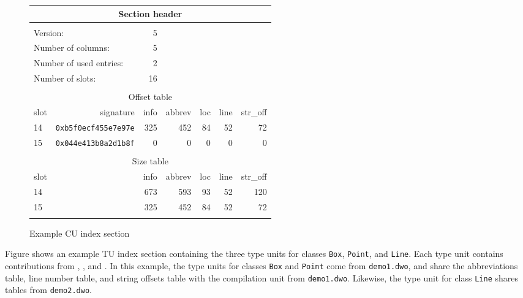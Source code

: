 \begin{figure}[ht]
\begin{center}
\begin{tabular}{lrrrrrr}
\\
  \multicolumn{7}{c}{Section header} \\
\hline \\
  \multicolumn{2}{l}{Version:}&                 5 &&&&\\
  \multicolumn{2}{l}{Number of columns:}&       5 &&&&\\
  \multicolumn{2}{l}{Number of used entries:}&  2 &&&&\\
  \multicolumn{2}{l}{Number of slots:}&         16 &&&&\\
\\
  \multicolumn{7}{c}{Offset table} \\
  \hline
  slot&  signature&             info&   abbrev&      loc&     line& str\_off \\
    14& \texttt{0xb5f0ecf455e7e97e}&      325&      452&       84&       52&       72 \\
    15& \texttt{0x044e413b8a2d1b8f}&        0&        0&        0&        0&        0 \\
\\
  \multicolumn{7}{c}{Size table} \\
  \hline
  slot&                    &     info&   abbrev&      loc&     line& str\_off \\
    14&                    &      673&      593&       93&       52&      120 \\
    15&                    &      325&      452&       84&       52&       72 \\
\\ \hline 
\end{tabular}
\end{center}
\caption{Example CU index section}
\label{fig:examplecuindexsection}
\end{figure}

Figure  
shows an example TU index section containing the
three type units for classes \texttt{Box}, \texttt{Point}, and 
\texttt{Line}. Each type unit
contains contributions from \dotdebuginfodwo{}, \dotdebugabbrevdwo{},
\dotdebuglinedwo{} and \dotdebugstroffsetsdwo{}. In this example, the
type units for classes \texttt{Box} and \texttt{Point} come from 
\texttt{demo1.dwo}, and
share the abbreviations table, line number table, and string
offsets table with the compilation unit from \texttt{demo1.dwo}. 
Likewise, the type unit for class \texttt{Line} shares tables 
from \texttt{demo2.dwo}. 

